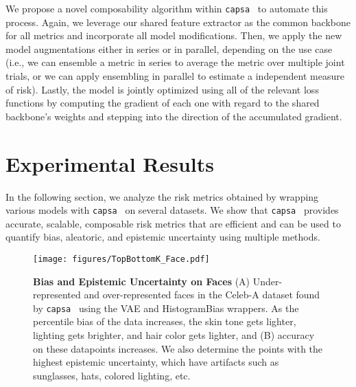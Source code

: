 \documentclass{article} %
\def\capsa{\texttt{{capsa}}}
\begin{document}
We propose a novel composability algorithm within \capsa~ to automate this process. Again, we leverage our shared feature extractor as the common backbone for all metrics and incorporate all model modifications. Then, we apply the new model augmentations either in series or in parallel, depending on the use case (i.e., we can ensemble a metric in series to average the metric over multiple joint trials, or we can apply ensembling in parallel to estimate a independent measure of risk). Lastly, the model is jointly optimized using all of the relevant loss functions by computing the gradient of each one with regard to the shared backbone’s weights and stepping into the direction of the accumulated gradient.


\section{Experimental Results}
In the following section, we analyze the risk metrics obtained by wrapping various models with \capsa~ on several datasets. We show that \capsa~ provides accurate, scalable, composable risk metrics that are efficient and can be used to quantify bias, aleatoric, and epistemic uncertainty using multiple methods. 
\begin{figure}[t!]
\centering
\texttt{[image: figures/TopBottomK\_Face.pdf]}
\caption{\textbf{Bias and Epistemic Uncertainty on Faces} (A) Under-represented and over-represented faces in the Celeb-A dataset found by \capsa~ using the VAE and HistogramBias wrappers. As the percentile bias of the data increases, the skin tone gets lighter, lighting gets brighter, and hair color gets lighter, and (B) accuracy on these datapoints increases. We also determine the points with the highest epistemic uncertainty, which have artifacts such as sunglasses, hats, colored lighting, etc.}
\label{fig:top-bottom-k-bias}
\end{figure}
\end{document}
